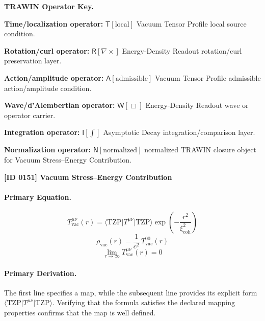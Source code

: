 \par\vspace{0.45\baselineskip}
\noindent\begin{minipage}[t]{\linewidth}
\begingroup
\small
\raggedright
\textbf{TRAWIN Operator Key.}\par
\noindent\textbf{Time/localization operator:} $\mathsf{T}\!\left[\mathrm{local}\right]$ Vacuum Tensor Profile local source condition.\par
\noindent\textbf{Rotation/curl operator:} $\mathsf{R}\!\left[\nabla\times\right]$ Energy-Density Readout rotation/curl preservation layer.\par
\noindent\textbf{Action/amplitude operator:} $\mathsf{A}\!\left[\mathrm{admissible}\right]$ Vacuum Tensor Profile admissible action/amplitude condition.\par
\noindent\textbf{Wave/d'Alembertian operator:} $\mathsf{W}\!\left[\Box\right]$ Energy-Density Readout wave or operator carrier.\par
\noindent\textbf{Integration operator:} $\mathsf{I}\!\left[\int\right]$ Asymptotic Decay integration/comparison layer.\par
\noindent\textbf{Normalization operator:} $\mathsf{N}\!\left[\mathrm{normalized}\right]$ normalized TRAWIN closure object for Vacuum Stress--Energy Contribution.\par
\endgroup
\end{minipage}

\clearpage
\noindent\textbf{[ID 0151] Vacuum Stress--Energy Contribution}\par
\vspace{0.35em}
\paragraph{Primary Equation.}
\[
T_{\mathrm{vac}}^{\mu\nu}(r)
=
\langle \mathrm{TZP}\vert T^{\mu\nu}\vert \mathrm{TZP}\rangle
\exp\!\left(-\frac{r^2}{\xi_{\mathrm{coh}}^2}\right)
\]
\[
\rho_{\mathrm{vac}}(r)=\frac{1}{c^2}\,T_{\mathrm{vac}}^{00}(r)
\]
\[
\lim_{r\to\infty} T_{\mathrm{vac}}^{\mu\nu}(r)=0
\]

\paragraph{Primary Derivation.}
The first line specifies a map, while the subsequent line provides its explicit form \( \langle \mathrm{TZP}\vert T^{\mu\nu}\vert \mathrm{TZP}\rangle \). Verifying that the formula satisfies the declared mapping properties confirms that the map is well defined.
